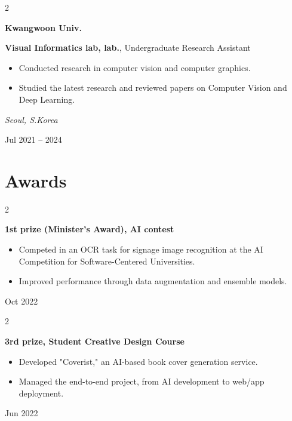 \documentclass[10pt, letterpaper]{article}
\newenvironment{highlights}{
    \begin{itemize}[
        topsep=0.10 cm,
        parsep=0.10 cm,
        partopsep=0pt,
        itemsep=0pt,
        leftmargin=0.4 cm + 10pt
    ]
}{
    \end{itemize}
} %
\newenvironment{twocolentry}[2][]{
    \onecolentry
    \def\secondColumn{#2}
    \setcolumnwidth{\fill, 4.5 cm}
    \begin{paracol}{2}
}{
    \switchcolumn \raggedleft \secondColumn
    \end{paracol}
    \endonecolentry
} %
\begin{document}
        \vspace{0.2 cm}


        \begin{twocolentry}{
            \small\textit{Seoul, S.Korea}
            
            \vspace{0.1cm}
            
            Jul 2021 – 2024
        }
            \textbf{\color{headingOrange}Kwangwoon Univ.}
                
            \vspace{0.2cm}
            
            \textbf{Visual Informatics lab, lab.}, Undergraduate Research Assistant
            \begin{highlights}
                \item Conducted research in computer vision and computer graphics.
                \item Studied the latest research and reviewed papers on Computer Vision and Deep Learning.
            \end{highlights}
        \end{twocolentry}
        
        \vspace{0.2 cm}

        
        \section{Awards}

            \begin{twocolentry}{
                Oct 2022
            }
                \textbf{1st prize (Minister's Award), AI contest}
                \begin{highlights}
                    \item Competed in an OCR task for signage image recognition at the AI Competition for Software-Centered Universities.
                    \item Improved performance through data augmentation and ensemble models.
                \end{highlights}
            \end{twocolentry}
        
            \vspace{0.2 cm}
        
            \begin{twocolentry}{
                Jun 2022
            }
                \textbf{3rd prize, Student Creative Design Course}
                \begin{highlights}
                    \item Developed "Coverist," an AI-based book cover generation service.
                    \item Managed the end-to-end project, from AI development to web/app deployment.
                \end{highlights}
            \end{twocolentry}
\end{document}
